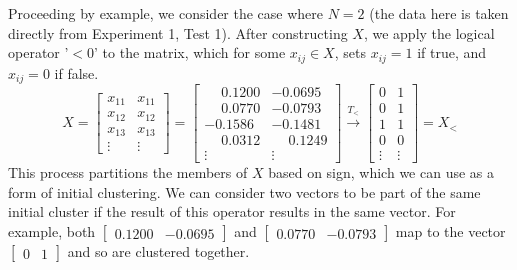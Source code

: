 \documentclass[11pt, letterpaper]{article}
\theoremstyle{perchance}
\begin{document}
        Proceeding by example, we consider the case where $N=2$ (the data here is taken directly from Experiment 1, Test 1). After constructing $X$, we apply the logical operator '$<0$' to the matrix, which for some $x_{ij} \in X$, sets $x_{ij} = 1$ if true, and $x_{ij} = 0$ if false.
        \[X = \begin{bmatrix}
            x_{11} & x_{11} \\
            x_{12} & x_{12} \\
            x_{13} & x_{13} \\
            \vdots & \vdots     
        \end{bmatrix} = \begin{bmatrix}
            \phantom{-}0.1200 & -0.0695 \\
            \phantom{-}0.0770 & -0.0793 \\
            -0.1586 & -0.1481 \\
            \phantom{-}0.0312 & \phantom{-}0.1249 \\
            \vdots & \vdots 
        \end{bmatrix} \xrightarrow{T_<} \begin{bmatrix}
            0 & 1 \\
            0 & 1 \\
            1 & 1 \\
            0 & 0 \\
            \vdots & \vdots     
        \end{bmatrix} = X_{<}\]
        This process partitions the members of $X$ based on sign, which we can use as a form of initial clustering. We can consider two vectors to be part of the same initial cluster if the result of this operator results in the same vector. For example, both $\begin{bmatrix} 0.1200 & -0.0695 \end{bmatrix}$ and $\begin{bmatrix} 0.0770 & -0.0793 \end{bmatrix}$ map to the vector $\begin{bmatrix} 0 & 1 \end{bmatrix}$ and so are clustered together. 
        
\end{document}
